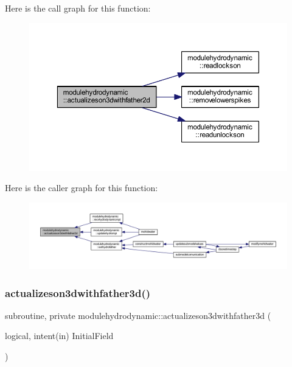 Here is the call graph for this function\+:\nopagebreak
\begin{figure}[H]
\begin{center}
\leavevmode
\includegraphics[width=350pt]{namespacemodulehydrodynamic_a22559e3146696632ddf4733faac3f167_cgraph}
\end{center}
\end{figure}
Here is the caller graph for this function\+:\nopagebreak
\begin{figure}[H]
\begin{center}
\leavevmode
\includegraphics[width=350pt]{namespacemodulehydrodynamic_a22559e3146696632ddf4733faac3f167_icgraph}
\end{center}
\end{figure}
\mbox{\label{namespacemodulehydrodynamic_af75db98fe37a03b0a927c6e2799e2b13}} 
\subsubsection{\texorpdfstring{actualizeson3dwithfather3d()}{actualizeson3dwithfather3d()}}
{\footnotesize\ttfamily subroutine, private modulehydrodynamic\+::actualizeson3dwithfather3d (\begin{DoxyParamCaption}\item[{logical, intent(in)}]{Initial\+Field }\end{DoxyParamCaption})\hspace{0.3cm}{\ttfamily [private]}}

